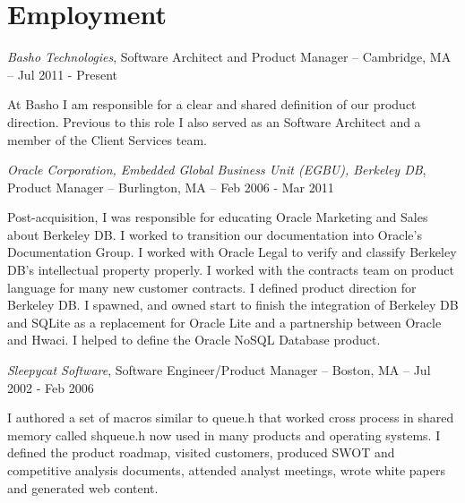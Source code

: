 \documentclass[letterpaper]{article}
\renewenvironment{itemize}{
  \begin{list}{}{
    \setlength{\leftmargin}{1.5em}
  }
}{
  \end{list}
}
\begin{document}
\section*{Employment}

\begin{itemize}
\item {\it Basho Technologies}, Software Architect and Product Manager -- Cambridge, MA -- Jul 2011 - Present

\begin{itemize}
\item At Basho I am responsible for a clear and shared definition of our
  product direction. Previous to this role I also served as an Software
  Architect and a member of the Client Services team.
\end{itemize}

\item {\it Oracle Corporation, Embedded Global Business Unit (EGBU), Berkeley DB}, Product Manager -- Burlington, MA -- Feb 2006 - Mar 2011

\begin{itemize}
\item Post-acquisition, I was responsible for educating Oracle Marketing and
  Sales about Berkeley DB.  I worked to transition our documentation into
  Oracle's Documentation Group.  I worked with Oracle Legal to verify and
  classify Berkeley DB's intellectual property properly.  I worked with the
  contracts team on product language for many new customer contracts.  I
  defined product direction for Berkeley DB.  I spawned, and owned start to
  finish the integration of Berkeley DB and SQLite as a replacement for Oracle
  Lite and a partnership between Oracle and Hwaci. I helped to define the
  Oracle NoSQL Database product.
\end{itemize}

\item {\it Sleepycat Software}, Software Engineer/Product Manager -- Boston, MA -- Jul 2002 - Feb 2006

\begin{itemize}
\item I authored a set of macros similar to queue.h that worked cross process
  in shared memory called shqueue.h now used in many products and operating
  systems.  I defined the product roadmap, visited customers, produced SWOT and
  competitive analysis documents, attended analyst meetings, wrote white papers
  and generated web content.
\end{itemize}


\end{itemize}
\end{document}
